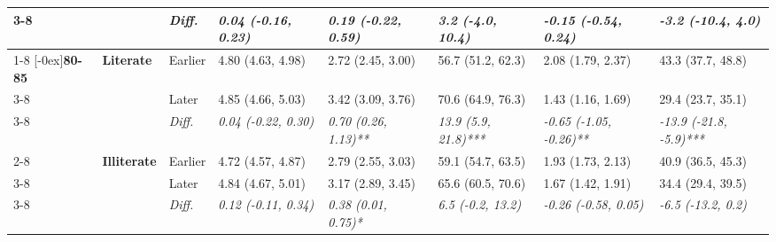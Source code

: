 \documentclass[12pt, a4paper]{article}
\begin{document}
\begin{appendices}
\begin{table}[!p]
{\begin{tabular}[t]{>{}l>{}lllllll}
        \cmidrule{3-8}
                                              &                                      & \cellcolor{gray!10}\em{Diff.} & \cellcolor{gray!10}\em{0.04 (-0.16, 0.23)}  & \cellcolor{gray!10}\em{0.19 (-0.22, 0.59)}  & \cellcolor{gray!10}\em{3.2 (-4.0, 10.4)}    & \cellcolor{gray!10}\em{-0.15 (-0.54, 0.24)}    & \cellcolor{gray!10}\em{-3.2 (-10.4, 4.0)}      \\
        \cmidrule{1-8}
        \multirow{9}{*}[-0ex]{\textbf{80-85}} & \multirow{3}{*}{\textbf{Literate}}   & Earlier                       & 4.80 (4.63, 4.98)                           & 2.72 (2.45, 3.00)                           & 56.7 (51.2, 62.3)                           & 2.08 (1.79, 2.37)                              & 43.3 (37.7, 48.8)                              \\
        \cmidrule{3-8}
                                              &                                      & Later                         & 4.85 (4.66, 5.03)                           & 3.42 (3.09, 3.76)                           & 70.6 (64.9, 76.3)                           & 1.43 (1.16, 1.69)                              & 29.4 (23.7, 35.1)                              \\
        \cmidrule{3-8}
                                              &                                      & \cellcolor{gray!10}\em{Diff.} & \cellcolor{gray!10}\em{0.04 (-0.22, 0.30)}  & \cellcolor{gray!10}\em{0.70 (0.26, 1.13)**} & \cellcolor{gray!10}\em{13.9 (5.9, 21.8)***} & \cellcolor{gray!10}\em{-0.65 (-1.05, -0.26)**} & \cellcolor{gray!10}\em{-13.9 (-21.8, -5.9)***} \\
        \cmidrule{2-8}
                                              & \multirow{3}{*}{\textbf{Illiterate}} & Earlier                       & 4.72 (4.57, 4.87)                           & 2.79 (2.55, 3.03)                           & 59.1 (54.7, 63.5)                           & 1.93 (1.73, 2.13)                              & 40.9 (36.5, 45.3)                              \\
        \cmidrule{3-8}
                                              &                                      & Later                         & 4.84 (4.67, 5.01)                           & 3.17 (2.89, 3.45)                           & 65.6 (60.5, 70.6)                           & 1.67 (1.42, 1.91)                              & 34.4 (29.4, 39.5)                              \\
        \cmidrule{3-8}
                                              &                                      & \cellcolor{gray!10}\em{Diff.} & \cellcolor{gray!10}\em{0.12 (-0.11, 0.34)}  & \cellcolor{gray!10}\em{0.38 (0.01, 0.75)*}  & \cellcolor{gray!10}\em{6.5 (-0.2, 13.2)}    & \cellcolor{gray!10}\em{-0.26 (-0.58, 0.05)}    & \cellcolor{gray!10}\em{-6.5 (-13.2, 0.2)}      \\

\end{tabular}}
\end{table}
\end{appendices}
\end{document}
